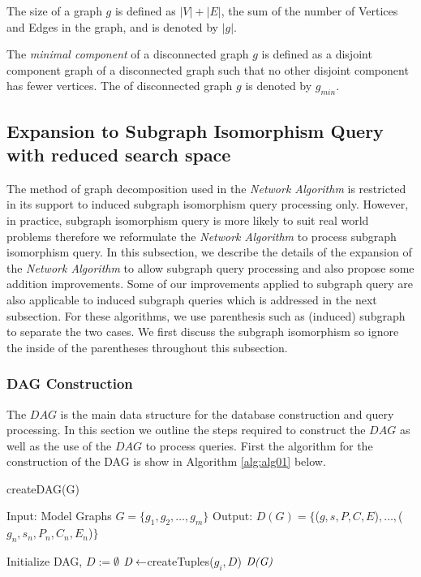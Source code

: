\begin{definition}
The size of a graph $g$ is defined as $|V| + |E|$, the sum of the number of Vertices and Edges  in the graph, and is denoted by $|g|$. 
\end{definition}  

\begin{definition}
The \textit{minimal component} of a disconnected graph $g$ is defined as a  disjoint component graph of a disconnected graph such that no other disjoint component has fewer vertices.
The  of disconnected graph $g$ is denoted by $g_{min}$.
\end{definition}  


\subsection{Expansion to Subgraph Isomorphism Query with reduced search space}

The method of graph decomposition used in the \textit{Network Algorithm} is restricted in its  support to induced subgraph isomorphism query processing only. 
However, in practice,  subgraph isomorphism query is more likely to suit real world problems therefore we reformulate the \textit{Network Algorithm} to process subgraph isomorphism query. 
In this subsection, we describe the details of the expansion of the \textit{Network Algorithm} to allow subgraph query processing and also propose some addition improvements. 
Some of our improvements applied to subgraph query are also applicable to induced subgraph queries which is addressed in the next subsection. For these algorithms, we use parenthesis such as (induced) subgraph to separate the two cases. 
We first discuss the subgraph isomorphism so ignore the inside of the parentheses throughout this subsection.

\subsubsection{DAG Construction}
The $DAG$ is the main data structure for the database construction and query processing. 
In this section we outline the steps required to construct the $DAG$ as well as the use of the $DAG$ to process queries. 
First the algorithm for the construction of the DAG is show in Algorithm \ref{alg:alg01} below.


\begin{algorithm}
\caption{createDAG(G)}
\label{alg:alg01}
\begin{algorithmic}
\STATE Input: Model Graphs $G =\{g_1,g_2,\dots,g_m\}$
\STATE Output: $D(G)= \{$($g,s,P,C,E$)$,\ldots,$($g_n,s_n,P_n,C_n,E_n$)$ \}$
\end{algorithmic}
\begin{algorithmic}[1]
\STATE Initialize DAG, $D:=\emptyset$
 \STATE  $\emph{D} \leftarrow $createTuples($g_i,D$)
\ENDFOR
\RETURN $\emph{D(G)}$
\end{algorithmic}
\end{algorithm}

